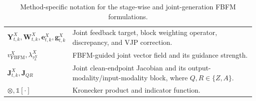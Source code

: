 \begin{table}[t]
\begin{tabular}{p{} p{}}
        $\mathbf Y_{t,k}^X,\mathbf W_{t,k}^X,\mathbf e_{t,k}^X,\mathbf g_{t,k}^X$
        & Joint feedback target, block weighting operator, discrepancy, and VJP correction.\\
        $v_{\mathrm{FBFM}}^X,\lambda_{\tau_k^X}^X$
        & FBFM-guided joint vector field and its guidance strength.\\
        $\mathbf J_{t,k}^X,\mathbf J_{QR}$
        & Joint clean-endpoint Jacobian and its output-modality/input-modality block, where $Q,R\in\{Z,A\}$.\\
        $\otimes,\mathbb 1[\cdot]$
        & Kronecker product and indicator function.\\
        \hline
    \end{tabular}
    \caption{Method-specific notation for the stage-wise and joint-generation FBFM formulations.}
    \label{tab:method-notation}
\end{table}
